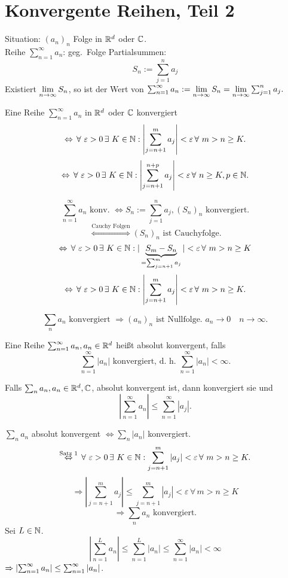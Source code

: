 \documentclass[../ana1.tex]{subfiles}
\begin{document}
\setcounter{section}{12}

\section{Konvergente Reihen, Teil 2}
Situation: \( {(a_n)}_n \) Folge in \( \mathbb{R}^d \) oder \( \mathbb{C} \).\\
Reihe \( \sum_{n=1}^\infty a_n \): geg.\ Folge Partialsummen:
\[ S_n := \sum_{j=1}^n a_j \]
Existiert \( \lim\limits_{n\rightarrow\infty} S_n \), so ist der Wert von \( \sum_{n=1}^\infty a_n := \lim\limits_{n\rightarrow\infty} S_n = \lim\limits_{n\rightarrow\infty} \sum_{j=1}^n a_j. \)
\begin{satz}[Cauchykriterium]
    Eine Reihe \( \sum_{n=1}^\infty a_n \) in \( \mathbb{R}^d \) oder \( \mathbb{C} \) konvergiert
    \[ \Leftrightarrow \, \forall \, \varepsilon > 0 \,\exists \, K\in\N: \left| \sum_{j=n+1}^m a_j \right| < \varepsilon \,\forall \, m>n\geq K. \]
    \[ \Leftrightarrow \, \forall \, \varepsilon > 0 \,\exists \, K\in\N: \left| \sum_{j=n+1}^{n+p} a_j \right| < \varepsilon \,\forall \, n\geq K, p\in\N. \]
\end{satz}
\begin{bew}
    \[ \sum_{n=1}^\infty a_n \text{ konv. } \Leftrightarrow S_n := \sum_{j=1}^n a_j, {(S_n)}_n \text{ konvergiert.} \]
    \[ \overset{\text{Cauchy Folgen}}{\Leftrightarrow} {(S_n)}_n \text{ ist Cauchyfolge.} \]
    \[ \Leftrightarrow \,\forall \, \varepsilon > 0 \,\exists \, K\in\N: |\underbrace{S_m - S_n}_{=\sum_{j=n+1}^m a_j}| < \varepsilon \,\forall \, m>n\geq K \]
    \[ \Leftrightarrow \,\forall \, \varepsilon > 0 \,\exists \, K\in\N: \left| \sum_{j=n+1}^m a_j \right| < \varepsilon \,\forall \, m>n\geq K. \]
\end{bew}
\begin{bem}
    \[ \sum_n a_n \text{ konvergiert } \Rightarrow {(a_n)}_n \text{ ist Nullfolge. } a_n \rightarrow 0 \quad n\rightarrow \infty. \]
\end{bem}
\begin{defi}
    Eine Reihe \( \sum_{n=1}^\infty a_n, a_n\in\mathbb{R}^d \) heißt absolut konvergent, falls
    \[ \sum_{n=1}^\infty |a_n| \text{ konvergiert, d.\ h.\ } \sum_{n=1}^{\infty} |a_n| < \infty. \]
\end{defi}
\begin{satz}
    Falls \( \sum_n a_n, a_n\in\mathbb{R}^d,\mathbb{C} \), absolut konvergent ist, dann konvergiert sie und
    \[ \left| \sum_{n=1}^\infty a_n \right| \leq \sum_{n=1}^\infty |a_j|. \]
\end{satz}
\begin{bew}
    \( \sum_n a_n \) absolut konvergent \( \Leftrightarrow \sum_n |a_n| \) konvergiert.
    \[ \overset{\text{Satz 1}}{\Leftrightarrow} \,\forall \, \varepsilon > 0 \,\exists \, K\in\N: \sum_{j=n+1}^m |a_j| < \varepsilon \,\forall \, m>n\geq K. \]
    \[ \Rightarrow \left| \sum_{j=n+1}^m a_j \right| \leq \sum_{j=n+1}^m |a_j| < \varepsilon \,\forall \, m>n\geq K \]
    \[ \Rightarrow \sum_n a_n \text{ konvergiert.} \]
    Sei \( L \in\mathbb{N} \). 
    \[ \left| \sum_{n=1}^L a_n \right| \leq \sum_{n=1}^L |a_n| \leq \sum_{n=1}^\infty |a_n| < \infty \]
    \( \Rightarrow \left|\sum_{n=1}^\infty a_n\right| \leq \sum_{n=1}^\infty \left|a_n\right| \).
\end{bew}
\end{document}

